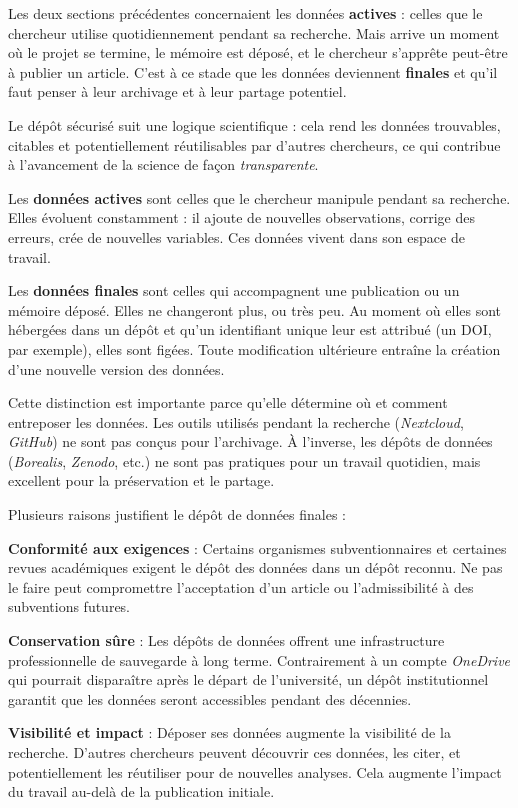 \documentclass[
  letterpaper,
  DIV=11,
  numbers=noendperiod,
  oneside]{scrreprt}
\begin{document}
Les deux sections précédentes concernaient les données \textbf{actives}
: celles que le chercheur utilise quotidiennement pendant sa recherche.
Mais arrive un moment où le projet se termine, le mémoire est déposé, et
le chercheur s'apprête peut-être à publier un article. C'est à ce stade
que les données deviennent \textbf{finales} et qu'il faut penser à leur
archivage et à leur partage potentiel.

Le dépôt sécurisé suit une logique scientifique : cela rend les données
trouvables, citables et potentiellement réutilisables par d'autres
chercheurs, ce qui contribue à l'avancement de la science de façon
\emph{transparente}.

Les \textbf{données actives} sont celles que le chercheur manipule
pendant sa recherche. Elles évoluent constamment : il ajoute de
nouvelles observations, corrige des erreurs, crée de nouvelles
variables. Ces données vivent dans son espace de travail.

Les \textbf{données finales} sont celles qui accompagnent une
publication ou un mémoire déposé. Elles ne changeront plus, ou très peu.
Au moment où elles sont hébergées dans un dépôt et qu'un identifiant
unique leur est attribué (un DOI, par exemple), elles sont figées. Toute
modification ultérieure entraîne la création d'une nouvelle version des
données.

Cette distinction est importante parce qu'elle détermine où et comment
entreposer les données. Les outils utilisés pendant la recherche
(\emph{Nextcloud}, \emph{GitHub}) ne sont pas conçus pour l'archivage. À
l'inverse, les dépôts de données (\emph{Borealis}, \emph{Zenodo}, etc.)
ne sont pas pratiques pour un travail quotidien, mais excellent pour la
préservation et le partage.

Plusieurs raisons justifient le dépôt de données finales :

\textbf{Conformité aux exigences} : Certains organismes subventionnaires
et certaines revues académiques exigent le dépôt des données dans un
dépôt reconnu. Ne pas le faire peut compromettre l'acceptation d'un
article ou l'admissibilité à des subventions futures.

\textbf{Conservation sûre} : Les dépôts de données offrent une
infrastructure professionnelle de sauvegarde à long terme. Contrairement
à un compte \emph{OneDrive} qui pourrait disparaître après le départ de
l'université, un dépôt institutionnel garantit que les données seront
accessibles pendant des décennies.

\textbf{Visibilité et impact} : Déposer ses données augmente la
visibilité de la recherche. D'autres chercheurs peuvent découvrir ces
données, les citer, et potentiellement les réutiliser pour de nouvelles
analyses. Cela augmente l'impact du travail au-delà de la publication
initiale.
\end{document}
